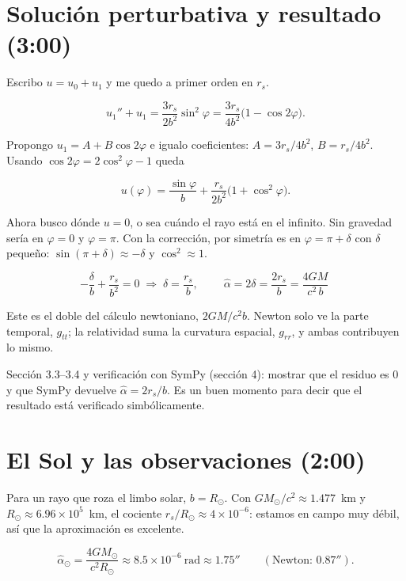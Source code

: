 \documentclass[11pt,a4paper]{article}
\newcommand{\rs}{r_s}
\newcommand{\ahat}{\hat\alpha}
\begin{document}
\section{Soluci\'on perturbativa y resultado \hfill\small(3:00)}

\begin{decir}
Escribo $u=u_0+u_1$ y me quedo a primer orden en $\rs$.
\end{decir}
\[
u_1''+u_1=\frac{3\rs}{2b^2}\sin^2\varphi=\frac{3\rs}{4b^2}\bigl(1-\cos2\varphi\bigr).
\]

\begin{decir}
Propongo $u_1=A+B\cos2\varphi$ e igualo coeficientes: $A=3\rs/4b^2$, $B=\rs/4b^2$. Usando $\cos2\varphi=2\cos^2\varphi-1$ queda
\end{decir}
\[
u(\varphi)=\frac{\sin\varphi}{b}+\frac{\rs}{2b^2}\bigl(1+\cos^2\varphi\bigr).
\]

\begin{decir}
Ahora busco d\'onde $u=0$, o sea cu\'ando el rayo est\'a en el infinito. Sin gravedad ser\'ia en $\varphi=0$ y $\varphi=\pi$. Con la correcci\'on, por simetr\'ia es en $\varphi=\pi+\delta$ con $\delta$ peque\~no: $\sin(\pi+\delta)\approx-\delta$ y $\cos^2\approx1$.
\end{decir}
\[
-\frac{\delta}{b}+\frac{\rs}{b^2}=0\;\Rightarrow\;\delta=\frac{\rs}{b},
\qquad
\boxed{\;\ahat=2\delta=\frac{2\rs}{b}=\frac{4GM}{c^2\,b}\;}
\]

\begin{decir}
Este es el doble del c\'alculo newtoniano, $2GM/c^2b$. Newton solo ve la parte temporal, $g_{tt}$; la relatividad suma la curvatura espacial, $g_{rr}$, y ambas contribuyen lo mismo.
\end{decir}

\begin{notebook}
Secci\'on 3.3--3.4 y verificaci\'on con SymPy (secci\'on 4): mostrar que el residuo es 0 y que SymPy devuelve $\ahat=2\rs/b$. Es un buen momento para decir que el resultado est\'a verificado simb\'olicamente.
\end{notebook}

\section{El Sol y las observaciones \hfill\small(2:00)}

\begin{decir}
Para un rayo que roza el limbo solar, $b=R_\odot$. Con $GM_\odot/c^2\approx1.477$~km y $R_\odot\approx6.96\times10^{5}$~km, el cociente $\rs/R_\odot\approx4\times10^{-6}$: estamos en campo muy d\'ebil, as\'i que la aproximaci\'on es excelente.
\end{decir}
\[
\ahat_\odot=\frac{4GM_\odot}{c^2R_\odot}\approx 8.5\times10^{-6}\ \text{rad}\approx 1.75''\qquad(\text{Newton: }0.87'').
\]
\end{document}
